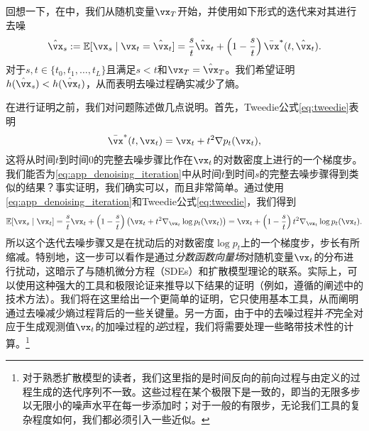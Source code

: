 \documentclass[../../book-main.tex]{subfiles}
\begin{document}
回想一下，在中，我们从随机变量\(\vx_{T}\)开始，并使用如下形式的迭代来对其进行去噪
\begin{equation}\label{eq:app_denoising_iteration}
    \hat{\vx}_{s} := \Ex[\vx_{s} \mid \vx_{t} = \hat{\vx}_{t}] = \frac{s}{t}\hat{\vx}_{t} + \bp{1 - \frac{s}{t}}\bar{\vx}^{\ast}(t, \hat{\vx}_{t}).
\end{equation}
对于\(s, t \in \{t_{0}, t_{1}, \dots, t_{L}\}\)且满足\(s < t\)和\(\vx_{T} = \hat{\vx}_{T}\)。我们希望证明\(h(\hat{\vx}_{s}) < h(\hat{\vx}_{t})\)，从而表明去噪过程确实减少了熵。

在进行证明之前，我们对问题陈述做几点说明。首先，Tweedie公式\eqref{eq:tweedie}表明
\begin{equation}
    \bar{\vx}^{\ast}(t, \vx_{t}) = \vx_{t} + t^{2}\nabla p_{t}(\vx_{t}),
\end{equation}
这将从时间\(t\)到时间\(0\)的完整去噪步骤比作在\(\vx_{t}\)的对数密度上进行的一个梯度步。我们能否为\eqref{eq:app_denoising_iteration}中从时间\(t\)到时间\(s\)的完整去噪步骤得到类似的结果？事实证明，我们确实可以，而且非常简单。通过使用\eqref{eq:app_denoising_iteration}和Tweedie公式\eqref{eq:tweedie}，我们得到
\begin{equation}\label{eq:app_denoising_iteration_score}
    \Ex[\vx_{s} \mid \vx_{t}] = \frac{s}{t}\vx_{t} + \bp{1 - \frac{s}{t}}\bp{\vx_{t} + t^{2}\nabla_{\vx_{t}}\log p_{t}(\vx_{t})} = \vx_{t} + \bp{1 - \frac{s}{t}}t^{2}\nabla_{\vx_{t}}\log p_{t}(\vx_{t}).
\end{equation}
所以这个迭代去噪步骤又是在扰动后的对数密度\(\log p_{t}\)上的一个梯度步，步长有所缩减。特别地，这一步可以看作是通过\textit{分数函数向量场}对随机变量\(\vx_{t}\)的分布进行扰动，这暗示了与随机微分方程（SDEs）和扩散模型理论\cite{song2020score}的联系。实际上，可以使用这种强大的工具和极限论证来推导以下结果的证明（例如，遵循\cite{DBLP:conf/iclr/ChenC0LSZ23}的阐述中的技术方法）。我们将在这里给出一个更简单的证明，它只使用基本工具，从而阐明通过去噪减少熵过程背后的一些关键量。另一方面，由于中的去噪过程并\textit{不}完全对应于生成观测值\(\vx_{t}\)的加噪过程的\textit{逆}过程，我们将需要处理一些略带技术性的计算。\footnote{对于熟悉扩散模型的读者，我们这里指的是时间反向的前向过程与由定义的过程生成的迭代序列不一致。这些过程在某个极限下是一致的，即当的无限多步以无限小的噪声水平在每一步添加时；对于一般的有限步，无论我们工具的复杂程度如何，我们都必须引入一些近似。}
\end{document}
